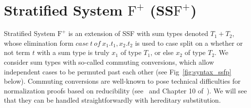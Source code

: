 \newcommand{\ccon}[4]{\mbox{case}\ #1\ \text{of}\ #2\text{.}#3\text{,}#2\text{.}#4}
\newcommand{\rcase}[5]{\mbox{rcase}_{#1}\ #2\ #3\ #4\ #5}
\newcommand{\F}[0]{\mbox{F}^{=}}
\newcommand{\Fp}[0]{\mbox{F}^{+}}
\newcommand{\STLCeq}[0]{\textnormal{STLC}^=}
\newcommand{\A}[0]{\mbox{\textbf{A}}}
\newcommand{\bredto}[0]{\rightsquigarrow_\beta}
\newcommand{\hlmn}[2]{
  \marginpar{
    \small
    {\color{blue}{
        \tiny #2
    }}}
    {\color{red}{
        #1
    }}
}

\section{Stratified System $\Fp$ (SS$\Fp$)}
\label{sec:stratified_system_f_with_sum_types}
Stratified System $\Fp$ is an extension of SSF with sum types denoted
$T_1 + T_2$, whose elimination form $\textit{case}\ t\
\textit{of}\ x_1.t_1,x_2.t_2$ is used to case split on a whether or
not term $t$ with a sum type is truly $x_1$ of type $T_1$, or else
$x_2$ of type $T_2$.  We consider sum types with so-called
commuting conversions, which allow independent cases to be permuted
past each other (see Fig~\ref{fig:syntax_ssfp} below).  Commuting
conversions are well-known to pose technical difficulties for
normalization proofs based on reducibility (see~\cite{tatsuta+05} and
Chapter 10 of~\cite{Girard:1989}).  We will see that they can be
handled straightforwardly with hereditary substitution.

